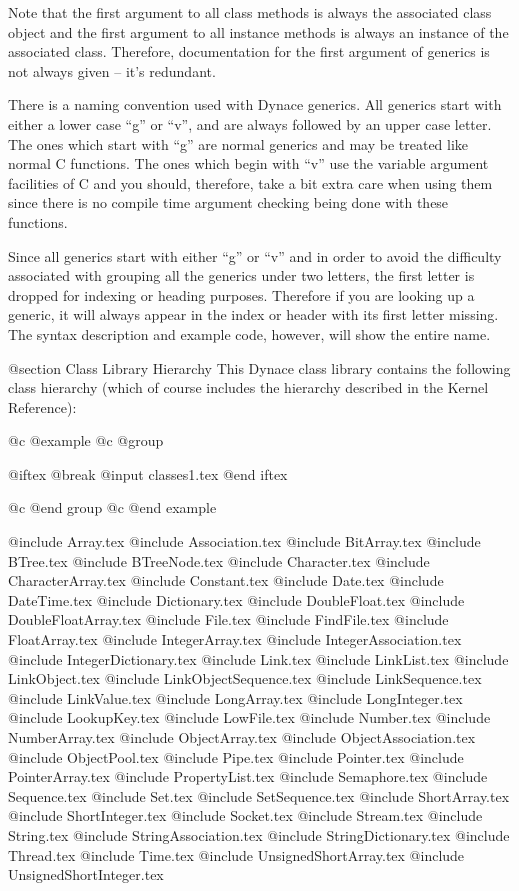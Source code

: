 Note that the first argument to all class methods is always the
associated class object and the first argument to all instance methods
is always an instance of the associated class.  Therefore, documentation
for the first argument of generics is not always given -- it's redundant.

There is a naming convention used with Dynace generics.  All generics
start with either a lower case ``g'' or ``v'', and are always
followed by an upper case letter.  The ones which start with ``g'' are
normal generics and may be treated like normal C functions.  The ones
which begin with ``v'' use the variable argument facilities of C and
you should, therefore, take a bit extra care when using them since
there is no compile time argument checking being done with these functions.

Since all generics start with either ``g'' or ``v'' and in order to
avoid the difficulty associated with grouping all the generics under
two letters, the first letter is dropped for indexing or heading
purposes.  Therefore if you are looking up a generic, it will always
appear in the index or header with its first letter missing.  The syntax
description and example code, however, will show the entire name.





@section Class Library Hierarchy
This Dynace class library contains the following class hierarchy (which of
course includes the hierarchy described in the Kernel Reference):

@c @example
@c @group

@iftex
@break
@input classes1.tex
@end iftex

@c @end group
@c @end example


@include Array.tex
@include Association.tex
@include BitArray.tex
@include BTree.tex
@include BTreeNode.tex
@include Character.tex
@include CharacterArray.tex
@include Constant.tex
@include Date.tex
@include DateTime.tex
@include Dictionary.tex
@include DoubleFloat.tex
@include DoubleFloatArray.tex
@include File.tex
@include FindFile.tex
@include FloatArray.tex
@include IntegerArray.tex
@include IntegerAssociation.tex
@include IntegerDictionary.tex
@include Link.tex
@include LinkList.tex
@include LinkObject.tex
@include LinkObjectSequence.tex
@include LinkSequence.tex
@include LinkValue.tex
@include LongArray.tex
@include LongInteger.tex
@include LookupKey.tex
@include LowFile.tex
@include Number.tex
@include NumberArray.tex
@include ObjectArray.tex
@include ObjectAssociation.tex
@include ObjectPool.tex
@include Pipe.tex
@include Pointer.tex
@include PointerArray.tex
@include PropertyList.tex
@include Semaphore.tex
@include Sequence.tex
@include Set.tex
@include SetSequence.tex
@include ShortArray.tex
@include ShortInteger.tex
@include Socket.tex
@include Stream.tex
@include String.tex
@include StringAssociation.tex
@include StringDictionary.tex
@include Thread.tex
@include Time.tex
@include UnsignedShortArray.tex
@include UnsignedShortInteger.tex


